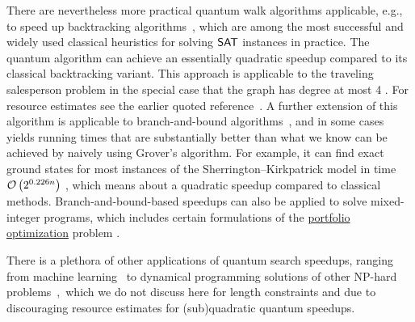 \begin{refsection}
	There are nevertheless more practical quantum walk algorithms applicable, e.g., to speed up backtracking algorithms~\cite{montanaro2015QuantumBacktracking, ambainis2017TreeSizeEstimation,jarret2017ImprovedQBacktracking,martiel2020practicalBacktracking}, which are among the most successful and widely used classical heuristics for solving $\mathsf{SAT}$ instances in practice.  The quantum algorithm can achieve an essentially quadratic speedup compared to its classical backtracking variant. This approach is applicable to the traveling salesperson problem in the special case that the graph has degree at most 4 \cite{moylett2017travelingSalemsanBoundedDegree}. For resource estimates see the earlier quoted reference~\cite{campbell2019ApplyingQToCSPs}. A further extension of this algorithm is applicable to branch-and-bound algorithms~\cite{montanaro2019QBranchAndBound,chakrabarti2022universal}, and in some cases yields running times that are substantially better than what we know can be achieved by naively using Grover's algorithm. For example, it can find exact ground states for most instances of the Sherrington--Kirkpatrick model \cite{sherrington1975solvable} in time $\mathcal{O}\left( 2^{0.226n} \right)$ \cite{montanaro2019QBranchAndBound}, which means about a quadratic speedup compared to classical methods. Branch-and-bound-based speedups can also be applied to solve mixed-integer programs, which includes certain formulations of the \hyperref[appl:PortfolioOptimization]{portfolio optimization} problem \cite{chakrabarti2022universal}. 
	
	There is a plethora of other applications of quantum search speedups, ranging from machine learning~\cite{wiebe2015QNearestNeighbour} to dynamical programming solutions of other NP-hard problems~\cite{ambainis2019QSpeedUpExpTimeDPAlgs},\ which we do not discuss here for length constraints and due to discouraging resource estimates for (sub)quadratic quantum speedups.


	\printbibliography[heading=secbib,segment=\therefsegment]
	
\end{refsection}

\newpage


